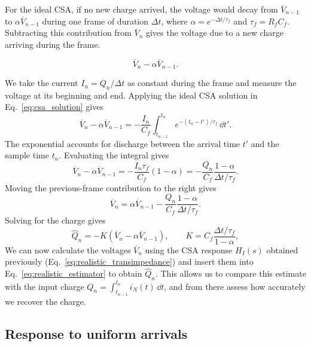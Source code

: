For the ideal CSA, if no new charge arrived, the voltage would decay from $\overline V_{n-1}$ to $\alpha\overline V_{n-1}$ during one frame of duration $\Delta t$, where $\alpha=e^{-\Delta t/\tau_f}$ and $\tau_f=R_fC_f$. Subtracting this contribution from $\overline V_n$ gives the voltage due to a new charge arriving during the frame.

\[
\overline V_n-\alpha\overline V_{n-1}.
\]

We take the current $I_n=Q_n/\Delta t$ as constant during the frame and measure the voltage at its beginning and end. Applying the ideal CSA solution in Eq.~\eqref{eq:csa_solution} gives
%
\begin{equation}
 \overline V_n-\alpha\overline V_{n-1}
 =-\frac{I_n}{C_f}\int_{t_{n-1}}^{t_n}
 e^{-(t_n-t')/\tau_f}\,\dd t'.
 \label{eq:realistic_frame_integral}
\end{equation}
%
The exponential accounts for discharge between the arrival time $t'$ and the sample time $t_n$. Evaluating the integral gives
\begin{equation}
 \overline V_n-\alpha\overline V_{n-1}
 =-\frac{I_n\tau_f}{C_f}(1-\alpha)
 =-\frac{Q_n}{C_f}\frac{1-\alpha}{\Delta t/\tau_f}.
 \label{eq:realistic_frame_increment}
\end{equation}
Moving the previous-frame contribution to the right gives
\begin{equation}
 \overline V_n=\alpha\overline V_{n-1}
 -\frac{Q_n}{C_f}\frac{1-\alpha}{\Delta t/\tau_f}.
 \label{eq:realistic_frame_voltage}
\end{equation}
Solving for the charge gives
%
\begin{equation}
 \widehat Q_n=-K\left(\overline V_n-\alpha\overline V_{n-1}\right),\qquad
 K=C_f\frac{\Delta t/\tau_f}{1-\alpha},
 \label{eq:realistic_estimator}
\end{equation}
%
We can now calculate the voltages $\overline V_n$ using the CSA response $H_I(s)$ obtained previously (Eq.~\eqref{eq:realistic_transimpedance}) and insert them into Eq.~\eqref{eq:realistic_estimator} to obtain $\widehat Q_n$. This allows us to compare this estimate with the input charge $Q_n=\int_{t_{n-1}}^{t_n}i_N(t)\,\dd t$, and from there assess how accurately we recover the charge.


\subsection{Response to uniform arrivals}
\label{sec:arrival_cases}


